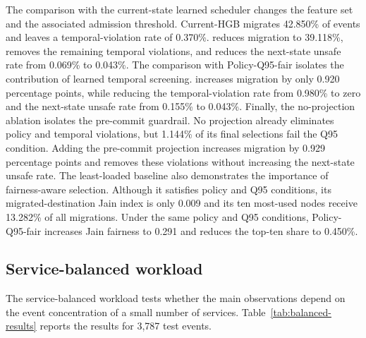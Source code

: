 The comparison with the current-state learned scheduler changes the
feature set and the associated admission threshold. Current-HGB migrates 42.850\%
of events and leaves a temporal-violation rate of 0.370\%. \cage reduces
migration to 39.118\%, removes the remaining temporal violations, and
reduces the next-state unsafe rate from 0.069\% to 0.043\%. The comparison with Policy-Q95-fair isolates the contribution of learned
temporal screening. \cage increases migration by only 0.920 percentage
points, while reducing the temporal-violation rate from 0.980\% to zero
and the next-state unsafe rate from 0.155\% to 0.043\%. Finally, the no-projection ablation isolates the pre-commit guardrail.
No projection already eliminates policy and temporal
violations, but 1.144\% of its final selections fail the Q95 condition.
Adding the pre-commit projection increases migration by 0.929 percentage
points and removes these violations without increasing the next-state
unsafe rate. The least-loaded baseline also demonstrates the importance of
fairness-aware selection. Although it satisfies policy and Q95
conditions, its migrated-destination Jain index is only 0.009 and its
ten most-used nodes receive 13.282\% of all migrations. Under the same
policy and Q95 conditions, Policy-Q95-fair increases Jain fairness to
0.291 and reduces the top-ten share to 0.450\%.

\subsection{Service-balanced workload}

The service-balanced workload tests whether the main observations depend
on the event concentration of a small number of services.
Table~\ref{tab:balanced-results} reports the results for 3,787 test
events.

